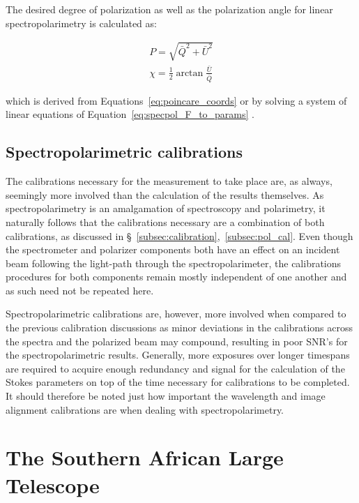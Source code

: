 The desired degree of polarization as well as the polarization angle for linear spectro\-polarimetry is calculated as:

\begin{equation}
  \begin{gathered}
    P    = \sqrt{\bar{Q}^{2} + \bar{U}^{2}} \\
    \chi = \frac{1}{2} \arctan \frac{\bar{U}}{\bar{Q}}
  \end{gathered}
  \label{eq:specpol_results}
\end{equation}

\noindent which is derived from Equations~\ref{eq:poincare_coords} or by solving a system of linear equations of Equation~\ref{eq:specpol_F_to_params} \citep{pol_std,keller_instr}.


\subsection{Spectropolarimetric calibrations}

The calibrations necessary for the measurement to take place are, as always, seemingly more involved than the calculation of the results themselves. As spectropolarimetry is an amalgamation of spectroscopy and polarimetry, it naturally follows that the calibrations necessary are a combination of both calibrations, as discussed in \S~\ref{subsec:calibration},~\ref{subsec:pol_cal}. Even though the spectrometer and polarizer components both have an effect on an incident beam following the light-path through the spectropolarimeter, the calibrations procedures for both components remain mostly independent of one another and as such need not be repeated here.
\prgph

Spectropolarimetric calibrations are, however, more involved when compared to the previous calibration discussions as minor deviations in the calibrations across the spectra and the polarized beam may compound, resulting in poor \gls{SNR}'s for the spectropolarimetric results. Generally, more exposures over longer timespans are required to acquire enough redundancy and signal for the calculation of the Stokes parameters on top of the time necessary for calibrations to be completed. It should therefore be noted just how important the wavelength and image alignment calibrations are when dealing with spectropolarimetry.


\section{The Southern African Large Telescope} \label{sec:SALT} %

